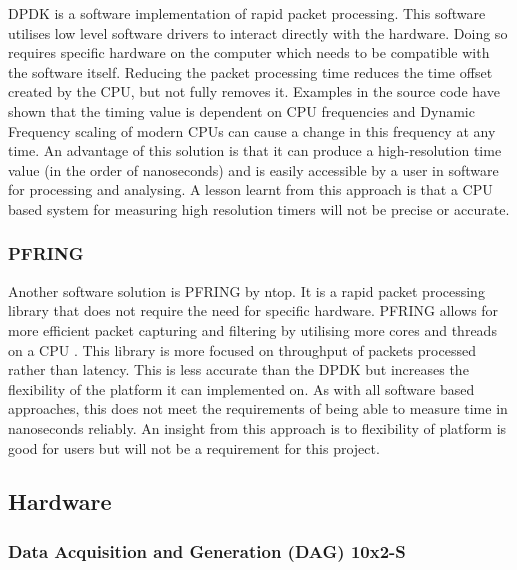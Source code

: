 DPDK is a software implementation of rapid packet processing. 
This software utilises low level software drivers to interact directly with the hardware. 
Doing so requires specific hardware on the computer which needs to be compatible with the software itself.
Reducing the packet processing time reduces the time offset created by the CPU, but not fully removes it. 
Examples in the source code have shown that the timing value is dependent on CPU frequencies \cite{dpdkcode} and Dynamic Frequency scaling \cite{turboboost} of modern CPUs can cause a change in this frequency at any time.
An advantage of this solution is that it can produce a high-resolution time value (in the order of nanoseconds) and is easily accessible by a user in software for processing and analysing. 
A lesson learnt from this approach is that a CPU based system for measuring high resolution timers will not be precise or accurate.

\subsubsection{PF\textunderscore RING}

Another software solution is PF\textunderscore RING by ntop\texttrademark. 
It is a rapid packet processing library that does not require the need for specific hardware.  
PF\textunderscore RING allows for more efficient packet capturing and filtering by utilising more cores and threads on a CPU \cite{pfringworks}.
This library is more focused on throughput of packets processed rather than latency. 
This is less accurate than the DPDK but increases the flexibility of the platform it can implemented on. 
As with all software based approaches, this does not meet the requirements of being able to measure time in nanoseconds reliably.
An insight from this approach is to flexibility of platform is good for users but will not be a requirement for this project.

\subsection{Hardware}

\subsubsection{Data Acquisition and Generation (DAG) 10x2-S}

